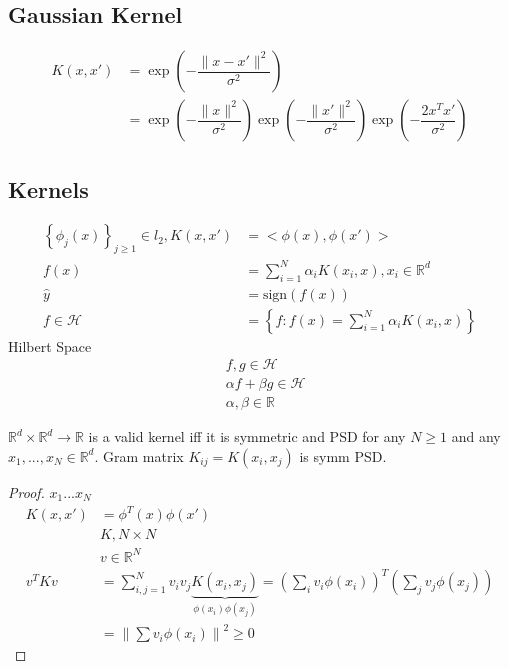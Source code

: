 \documentclass{article}
\begin{document}
\subsection{Gaussian Kernel}
\begin{align*}
K\left(x, x'\right)  &= \exp\left(- \dfrac{\| x - x' \|^{2}}{\sigma^{2}}\right)
\\ &= \exp\left(- \dfrac{\| x \|^{2}}{\sigma^{2}}\right) \exp\left(- \dfrac{\| x' \|^{2}}{\sigma^{2}}\right) \exp\left(- \dfrac{2 x^{T} x'}{\sigma^{2}}\right)
\end{align*}


\subsection{Kernels}
\begin{align*}
\left\{\phi_{j}\left(x\right)\right\}_{j \geq  1} \in l_{2}, K\left(x, x'\right)  &= < \phi\left(x\right), \phi\left(x'\right) >
\\ f\left(x\right)  &= \displaystyle\sum_{i=1}^{N} \alpha_{i} K\left(x_{i}, x\right), x_{i} \in \mathbb{R}^{d}
\\ \hat{y} &= \text{sign}\left(f\left(x \right)\right)
\\ f  \in \mathcal{H} &= \left\{f : f\left(x\right) = \displaystyle\sum_{i=1}^{N} \alpha_{i} K\left(x_{i}, x\right)\right\}
\end{align*}
Hilbert Space
\begin{align*}
&f , g \in \mathcal{H}
\\ &\alpha f + \beta g \in \mathcal{H}
\\ &\alpha, \beta \in \mathbb{R}
\end{align*}
\begin{lem} \label{lem:hil} 
$\mathbb{R}^{d} \times \mathbb{R}^{d} \to  \mathbb{R}$ is a valid kernel iff it is symmetric and PSD for any $N  \geq  1$ and any $x_{1}, ..., x_{N} \in \mathbb{R}^{d}$. Gram matrix $K_{ij} = K\left(x_{i}, x_{j}\right)$ is symm PSD.
\end{lem}
\begin{proof} \label{proof:hil1} 
$x_{1} ... x_{N}$
\begin{align*}
K\left(x, x'\right)  &= \phi^{T}\left(x\right) \phi\left(x'\right)
\\ &  K , N \times N 
\\ &  v  \in \mathbb{R}^{N}
\\ v^{T} K v &= \displaystyle\sum_{i,j = 1}^{N} v_{i} v_{j} \underbrace{K\left(x_{i}, x_{j}\right)}_{\phi\left(x_{i}\right) \phi\left(x_{j}\right)} = \left(\displaystyle\sum_{i} v_{i} \phi\left(x_{i}\right)\right)^{T} \left(\displaystyle\sum_{j} v_{j} \phi\left(x_{j}\right)\right)
\\ &= \left\| \displaystyle\sum v_{i} \phi\left(x_{i}\right) \right\|^{2} \geq  0
\end{align*}
\end{proof}
\end{document}
